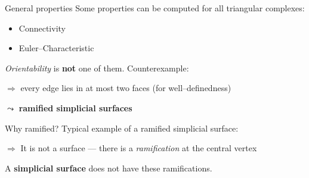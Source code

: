 \begin{frame}{General properties}
    Some properties can be computed for all triangular complexes:
    \pause
    \begin{itemize}
        \item Connectivity
        \pause
        \item Euler--Characteristic
    \end{itemize}
    \pause
    \textit{Orientability} is \textbf{not} one of them.
    \pause
    Counterexample:
        \begin{center}
            \begin{tikzpicture}
                
	    \end{tikzpicture}
        \end{center}
    \pause
    $\Rightarrow$ every edge lies in at most two faces (for well--definedness)
    
    \pause
    $\leadsto$ \textbf{ramified simplicial surfaces}
\end{frame}


\begin{frame}{Why ramified?}
    \pause
    Typical example of a ramified simplicial surface:
    \begin{center}
        \begin{tikzpicture}
            
        \end{tikzpicture}
    \end{center}
    \pause
    $\Rightarrow$ It is not a surface --- there is a \textit{ramification} at 
        the central vertex
    
    \pause
    A \textbf{simplicial surface} does not have these ramifications.
\end{frame}


